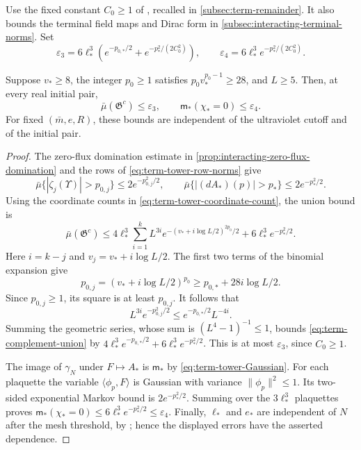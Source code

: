 \documentclass[11pt,letterpaper,reqno]{amsart}
\begin{document}
Use the fixed constant $C_0\ge1$ of
\cite[(25)]{QED3Integration}, recalled in
\cref{subsec:term-remainder}. It also bounds the terminal
field maps and Dirac form in
\cref{subsec:interacting-terminal-norms}. Set
\begin{equation}\label{eq:term-complement-errors}
 \varepsilon_3
 =6\ell_*^3\left(e^{-p_{0,*}/2}
                    +e^{-p_*^2/(2C_0^2)}\right),\qquad
 \varepsilon_4=6\ell_*^3e^{-p_*^2/(2C_0^2)}.
\end{equation}

\begin{proposition}\label{prop:term-complement}
Suppose $v_*\ge8$, the integer $p_0\ge1$ satisfies
$p_0v_*^{p_0-1}\ge28$, and $L\ge5$. Then, at every
real initial pair,
\begin{equation}\label{eq:term-complement-bound}
 \bar\mu(\mathfrak G^c)\le\varepsilon_3,\qquad
             \mathsf m_*(\chi_*=0)\le\varepsilon_4.
\end{equation}
For fixed $(\bar m,e,R)$, these bounds are independent
of the ultraviolet cutoff and of the initial pair.
\end{proposition}

\begin{proof}
The zero-flux domination estimate in
\cref{prop:interacting-zero-flux-domination}
and the rows of \eqref{eq:term-tower-row-norms} give
\[
 \bar\mu\{|\zeta_j(\Upsilon)|>p_{0,j}\}
                   \le2e^{-p_{0,j}^2/2},\qquad
 \bar\mu\{|(dA_*)(p)|>p_*\}\le2e^{-p_*^2/2}.
\]
Using the coordinate counts in
\eqref{eq:term-tower-coordinate-count}, the union bound is
\begin{equation}\label{eq:term-complement-union}
 \bar\mu(\mathfrak G^c)
 \le4\ell_*^3\sum_{i=1}^{k}L^{3i}
                  e^{-(v_*+i\log L/2)^{2p_0}/2}
                +6\ell_*^3e^{-p_*^2/2}.
\end{equation}
Here $i=k-j$ and $v_j=v_*+i\log L/2$.
The first two terms of the binomial expansion give
\[
 p_{0,j}=(v_*+i\log L/2)^{p_0}
       \ge p_{0,*}+28i\log L/2.
\]
Since $p_{0,j}\ge1$, its square is at least $p_{0,j}$.
It follows that
\[
 L^{3i}e^{-p_{0,j}^2/2}
                  \le e^{-p_{0,*}/2}L^{-4i}.
\]
Summing the geometric series, whose sum is
$(L^4-1)^{-1}\le1$, bounds
\eqref{eq:term-complement-union} by
$4\ell_*^3e^{-p_{0,*}/2}+6\ell_*^3e^{-p_*^2/2}$.
This is at most $\varepsilon_3$, since $C_0\ge1$.

The image of $\gamma_N$ under $F\mapsto A_*$ is
$\mathsf m_*$ by \eqref{eq:term-tower-Gaussian}.
For each plaquette the variable
$\langle\phi_p,F\rangle$ is Gaussian with variance
$\|\phi_p\|^2\le1$. Its two-sided exponential Markov
bound is $2e^{-p_*^2/2}$.
Summing over the $3\ell_*^3$ plaquettes proves
$\mathsf m_*(\chi_*=0)\le6\ell_*^3e^{-p_*^2/2}
\le\varepsilon_4$.
Finally, $\ell_*$ and $e_*$ are independent of $N$
after the mesh threshold, by
\cite[Proposition~6.1]{CoverTuning}; hence the displayed
errors have the asserted dependence.
\end{proof}
\end{document}
